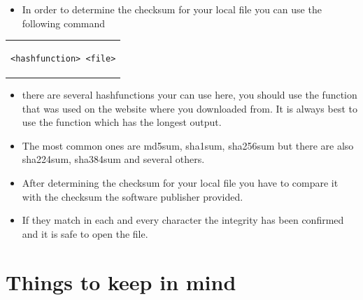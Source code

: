 \documentclass[a4paper,10pt]{article}
\begin{document}
\begin{itemize}[leftmargin=*]

\item In order to determine the checksum for your local file you can use the following command
\end{itemize}

\begin{center}
\begin{tabular}{c}
\begin{lstlisting}
<hashfunction> <file>
\end{lstlisting}
\end{tabular}
\end{center}

\begin{itemize}[leftmargin=*]
\item there are several hashfunctions your can use here, you should use the function that was used on the website where you downloaded from. It is always best to use the function which has the longest output.
\item The most common ones are md5sum, sha1sum, sha256sum but there are also sha224sum, sha384sum and several others. 
\item After determining the checksum for your local file you have to compare it with the checksum the software publisher provided.
\item If they match in each and every character the integrity has been confirmed and it is safe to open the file.
\end{itemize}

\section{Things to keep in mind}
\end{document}
